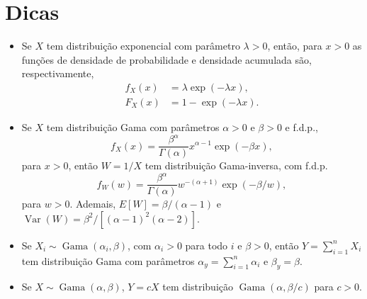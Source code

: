 \documentclass[a4paper,10pt, notitlepage]{report}
\newcommand{\vr}{\operatorname{Var}} %
\newcommand{\rs}{X_1, X_2, \ldots, X_n} %
\begin{document}
\section*{Dicas}
\begin{itemize}
 \item Se $X$ tem distribuição exponencial com parâmetro $\lambda > 0$, então, para $x>0$ as funções de densidade de probabilidade e densidade acumulada são, respectivamente,
 \begin{align*}
 f_X(x) &= \lambda \exp\left(-\lambda x\right),\\
 F_X(x) &= 1 - \exp(-\lambda x).
 \end{align*}
 \item Se $X$ tem distribuição Gama com parâmetros $\alpha >0$ e $\beta >0$ e f.d.p.,
 $$
 f_X(x) = \frac{\beta^\alpha}{\Gamma(\alpha)} x^{\alpha - 1} \exp(-\beta x),
 $$
 para $x>0$, então $W = 1/X$ tem distribuição Gama-inversa, com f.d.p.
 $$
 f_W(w) = \frac{\beta^\alpha}{\Gamma(\alpha)} w^{-(\alpha + 1)} \exp(-\beta/w),
 $$
 para $w>0$.
 Ademais, $E[W] = \beta/(\alpha - 1)$ e $\vr(W) = \beta^2/[(\alpha-1)^2(\alpha-2)]$.
\item Se $X_i \sim \operatorname{Gama}(\alpha_i, \beta)$, com $\alpha_i >0$  para todo $i$ e $\beta>0$, então $Y = \sum_{i=1}^n X_i$ tem distribuição Gama com parâmetros $\alpha_y = \sum_{i=1}^n \alpha_i$ e $\beta_y = \beta$.
\item Se $X \sim \operatorname{Gama}(\alpha, \beta)$, $Y = cX$ tem distribuição $\operatorname{Gama}(\alpha, \beta/c)$ para $c>0$.
 \end{itemize}
 
\end{document}
